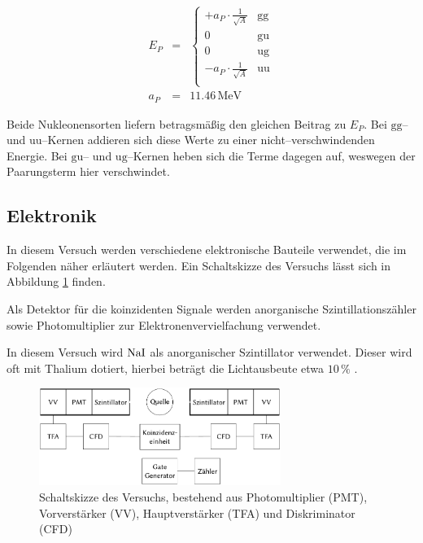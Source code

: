 \documentclass[12pt,a4paper]{scrartcl}
\numberwithin{equation}{section} %
\begin{document}
\begin{eqnarray}
	E_P &=&
	\begin{cases}
		+ a_P\cdot \frac{1}{\sqrt{A}} & \text{gg} \\
		0 & \text{gu} \\
		0 & \text{ug} \\
		- a_P\cdot \frac{1}{\sqrt{A}} & \text{uu} \\
	\end{cases}
	\label{Paarungsterm} \\
	a_P &=& 11.46\mathrm{\,MeV}
\end{eqnarray}

\noindent
Beide Nukleonensorten liefern betragsmäßig den gleichen Beitrag zu $E_P$. Bei $\mathrm{gg}$-- und $\mathrm{uu}$--Kernen addieren sich diese Werte zu einer nicht--verschwindenden Energie. Bei $\mathrm{gu}$-- und $\mathrm{ug}$--Kernen heben sich die Terme dagegen auf, weswegen der Paarungsterm hier verschwindet.

\hypertarget{elektronik}{%
\subsection{Elektronik}\label{elektronik}}

In diesem Versuch werden verschiedene elektronische Bauteile verwendet, die im Folgenden näher erläutert werden. Ein Schaltskizze des Versuchs lässt sich in Abbildung \ref{abb:Schaltplan} finden.

Als Detektor für die koinzidenten Signale werden anorganische Szintillationszähler sowie Photomultiplier zur Elektronenvervielfachung verwendet.

In diesem Versuch wird $\ce{NaI}$ als anorganischer Szintillator verwendet. Dieser wird oft mit Thalium dotiert, hierbei beträgt die Lichtausbeute etwa $10\,\%$ \cite{EigenschaftenSzintillatoren}.

\begin{figure}[h]
	\centering
	\includegraphics[width=0.7\textwidth]{../media/B3.4/Schaltplan.pdf}
	\caption{Schaltskizze des Versuchs, bestehend aus
		Photomultiplier (PMT), Vorverstärker (VV),
		Hauptverstärker (TFA) und Diskriminator (CFD) \cite{UzK}}
	\label{abb:Schaltplan}
\end{figure}
\end{document}
